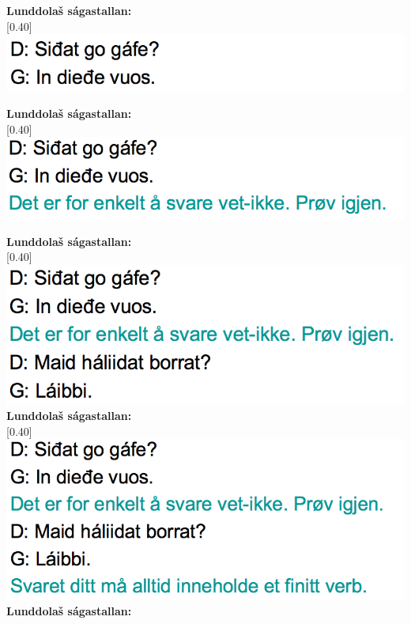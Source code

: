 \documentclass[landscape,norsk,11pt]{seminar}
\begin{document}
\begin{slide}
\newslide
\textbf{Lunddolaš ságastallan:} \\

\scalebox{0.40}[0.40]{\includegraphics{img/lgiella1.png}} 

\newslide
\textbf{Lunddolaš ságastallan:} \\

\scalebox{0.40}[0.40]{\includegraphics{img/lgiella2.png}} 

\newslide
\textbf{Lunddolaš ságastallan:} \\

\scalebox{0.40}[0.40]{\includegraphics{img/lgiella3.png}} 
\newslide
\textbf{Lunddolaš ságastallan:} \\

\scalebox{0.40}[0.40]{\includegraphics{img/lgiella4.png}} 
\newslide
\textbf{Lunddolaš ságastallan:} \\


\end{slide}
\end{document}
